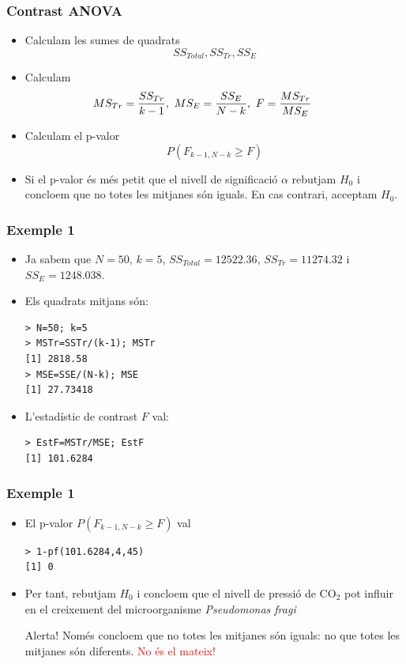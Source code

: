 \documentclass[12pt,t]{beamer}
\newcommand{\red}[1]{\textcolor{red}{#1}}
\renewcommand{\emph}[1]{{\color{red}#1}}
\renewcommand{\geq}{\geqslant}
\theoremstyle{plain}
\theoremstyle{definition}
\begin{document}
\begin{frame}
\frametitle{Contrast ANOVA}
\begin{itemize}
\item Calculam les sumes de quadrats 
$$
SS_{Total}, SS_{Tr}, SS_E
$$

\item Calculam 
$$
\hspace*{-5ex} MS_{Tr}=\frac{SS_{Tr}}{k-1},\
MS_E=\frac{SS_E}{N-k},\ F=\frac{MS_{Tr}}{MS_E}
$$

\item Calculam el p-valor
$$
P(F_{k-1,N-k}\geq F)
$$

\item Si el p-valor és més petit que el nivell de significació $\alpha$  rebutjam $H_0$ i concloem que no totes les mitjanes són iguals. En cas contrari, acceptam $H_0$.
\end{itemize}
\end{frame}

\begin{frame}[fragile]
\frametitle{Exemple 1}
\begin{itemize}
\item Ja sabem que $N=50$, $k=5$,   $SS_{Total}=12522.36$,
$SS_{Tr}=11274.32$ i $SS_E=1248.038$.
\medskip

\item Els quadrats mitjans són:
\begin{verbatim}
> N=50; k=5
> MSTr=SSTr/(k-1); MSTr
[1] 2818.58
> MSE=SSE/(N-k); MSE
[1] 27.73418
\end{verbatim}
\medskip

\item L'estadístic de contrast $F$ val:
\begin{verbatim}
> EstF=MSTr/MSE; EstF
[1] 101.6284
\end{verbatim}
\end{itemize}
\end{frame}

\begin{frame}[fragile]
\frametitle{Exemple 1}

\begin{itemize}
\item El p-valor  $P(F_{k-1,N-k}\geq F)$ val
\begin{verbatim}
> 1-pf(101.6284,4,45)
[1] 0
\end{verbatim}
\medskip

\item Per tant,
rebutjam $H_0$ i concloem que el nivell de pressió de CO${}_2$ pot influir en
el creixement del microorganisme {\it Pseudomonas fragi}
\bigskip

\emph{Alerta!} Només concloem que no totes les mitjanes són iguals: no que totes les mitjanes són diferents. \red{No és el mateix!}

\end{itemize}
\end{frame}
\end{document}

